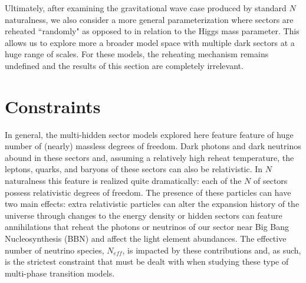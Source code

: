 \documentclass[nofootinbib,twocolumn,preprintnumbers]{revtex4-1}
\begin{document}
Ultimately, after examining the gravitational wave case produced by standard $N$naturalness, we also consider a more general parameterization where sectors are reheated ``randomly" as opposed to in relation to the Higgs mass parameter. This allows us to explore more a broader model space with multiple dark sectors at a huge range of scales. For these models, the reheating mechanism remains undefined and the results of this section are completely irrelevant. 


\section{Constraints}
\label{sec:constraints}



In general, the multi-hidden sector models explored here feature feature of huge number of (nearly) massless degrees of freedom. Dark photons and dark neutrinos abound in these sectors and, assuming a relatively high reheat temperature, the leptons, quarks, and baryons of these sectors can also be relativistic. In $N$naturalness this feature is realized quite dramatically: each of the $N$ of sectors possess relativistic degrees of freedom. The presence of these particles can have two main effects: extra relativistic particles can alter the expansion history of the universe through changes to the energy density or hidden sectors can feature annihilations that reheat the photons or neutrinos of our sector near Big Bang Nucleosynthesis (BBN) and affect the light element abundances. The effective number of neutrino species, $N_{eff}$, is impacted by these contributions and, as such, is the strictest constraint that must be dealt with when studying these type of multi-phase transition models. 
\end{document}
